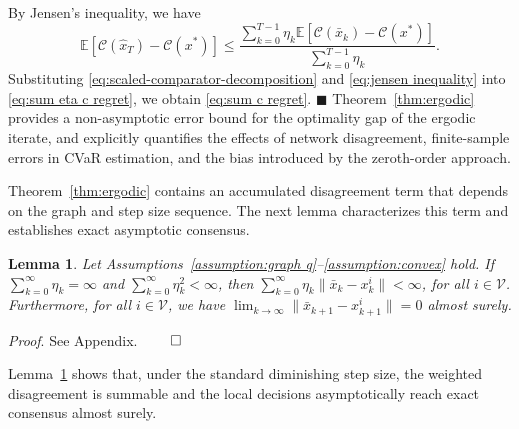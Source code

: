 \documentclass[twocolumn]{autart}    %
\newcommand{\brk}[1]{\left[#1\right]}
\newtheorem{lemma}{Lemma}
\newcommand{\1}{\mathbf{1}}
\begin{document}
By Jensen's inequality, we have  
\begin{equation}\label{eq:jensen inequality}
\mathbb{E}\brk{\mathcal{C}(\hat{x}_T) - \mathcal{C}(x^\ast) }\le \frac{\sum_{k=0}^{T-1}\eta_{k}\mathbb{E}\brk{\mathcal{C}(\bar{x}_k)-\mathcal{C}(x^\ast)}}{\sum_{k=0}^{T-1}\eta_{k}} .  
\end{equation} 
Substituting \eqref{eq:scaled-comparator-decomposition} and \eqref{eq:jensen inequality} into \eqref{eq:sum eta c regret}, we obtain \eqref{eq:sum c regret}. 
\hfill $\blacksquare$
Theorem~\ref{thm:ergodic} provides a non-asymptotic error bound for the optimality gap of the ergodic iterate, and explicitly quantifies the effects of network disagreement, finite-sample errors in CVaR estimation, and the bias introduced by the zeroth-order approach.

Theorem~\ref{thm:ergodic} contains an accumulated disagreement term that depends on the graph and step size sequence. The next lemma characterizes this term and establishes exact asymptotic consensus.
\begin{lemma}\label{lemma:exact consensus}
Let Assumptions~\ref{assumption:graph q}--\ref{assumption:convex} hold. 
If $\sum_{k=0}^\infty \eta_k = \infty$ and $\sum_{k=0}^\infty \eta_k^2<\infty $, then $\sum_{k=0}^\infty\eta_k  \|\bar{x}_k-x_k^i\|  < \infty$, for all $i \in \mathcal{V}$. Furthermore, for all $i\in\mathcal{V}$, we have $\lim_{k\rightarrow\infty}\|\bar{x}_{k+1}-x_{k+1}^i\|=0$ almost surely.
\end{lemma}
\textit{Proof}.    See Appendix. 
\hfill $\qed$

Lemma~\ref{lemma:exact consensus} shows that, under the standard diminishing step size, the weighted disagreement is summable and the local decisions asymptotically reach exact consensus almost surely.
\end{document}
